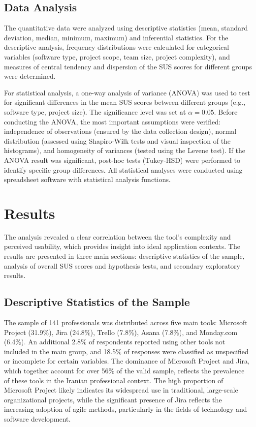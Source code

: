 \documentclass[runningheads]{llncs}
\begin{document}
\subsection{Data Analysis}
The quantitative data were analyzed using descriptive statistics (mean, standard deviation, median, minimum, maximum) and inferential statistics. For the descriptive analysis, frequency distributions were calculated for categorical variables (software type, project scope, team size, project complexity), and measures of central tendency and dispersion of the SUS scores for different groups were determined.


For statistical analysis, a one-way analysis of variance (ANOVA) was used to test for significant differences in the mean SUS scores between different groups (e.g., software type, project size). The significance level was set at \(\alpha = 0.05\). Before conducting the ANOVA, the most important assumptions were verified: independence of observations (ensured by the data collection design), normal distribution (assessed using Shapiro-Wilk tests and visual inspection of the histograms), and homogeneity of variances (tested using the Levene test). If the ANOVA result was significant, post-hoc tests (Tukey-HSD) were performed to identify specific group differences. All statistical analyses were conducted using spreadsheet software with statistical analysis functions.

\section{Results}
The analysis revealed a clear correlation between the tool’s complexity and perceived usability, which provides insight into ideal application contexts. The results are presented in three main sections: descriptive statistics of the sample, analysis of overall SUS scores and hypothesis tests, and secondary exploratory results.

\subsection{Descriptive Statistics of the Sample}
The sample of 141 professionals was distributed across five main tools: Microsoft Project (31.9\%), Jira (24.8\%), Trello (7.8\%), Asana (7.8\%), and Monday.com (6.4\%). An additional 2.8\% of respondents reported using other tools not included in the main group, and 18.5\% of responses were classified as unspecified or incomplete for certain variables. The dominance of Microsoft Project and Jira, which together account for over 56\% of the valid sample, reflects the prevalence of these tools in the Iranian professional context. The high proportion of Microsoft Project likely indicates its widespread use in traditional, large-scale organizational projects, while the significant presence of Jira reflects the increasing adoption of agile methods, particularly in the fields of technology and software development.
\end{document}
